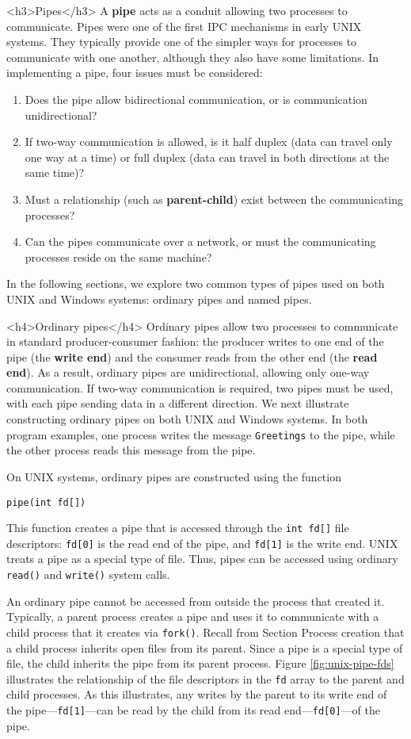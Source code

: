 <h3>Pipes</h3>
A \textbf{pipe} acts as a conduit allowing two processes to communicate. Pipes were one of the first IPC mechanisms in early UNIX systems. They typically provide one of the simpler ways for processes to communicate with one another, although they also have some limitations. In implementing a pipe, four issues must be considered:
\begin{enumerate}
\item Does the pipe allow bidirectional communication, or is communication unidirectional?
\item If two-way communication is allowed, is it half duplex (data can travel only one way at a time) or full duplex (data can travel in both directions at the same time)?
\item Must a relationship (such as \textbf{parent-child}) exist between the communicating processes?
\item Can the pipes communicate over a network, or must the communicating processes reside on the same machine?
\end{enumerate}
In the following sections, we explore two common types of pipes used on both UNIX and Windows systems: ordinary pipes and named pipes.

<h4>Ordinary pipes</h4>
Ordinary pipes allow two processes to communicate in standard producer-consumer fashion: the producer writes to one end of the pipe (the \textbf{write end}) and the consumer reads from the other end (the \textbf{read end}). As a result, ordinary pipes are unidirectional, allowing only one-way communication. If two-way communication is required, two pipes must be used, with each pipe sending data in a different direction. We next illustrate constructing ordinary pipes on both UNIX and Windows systems. In both program examples, one process writes the message \texttt{Greetings} to the pipe, while the other process reads this message from the pipe.

On UNIX systems, ordinary pipes are constructed using the function
\begin{verbatim}
pipe(int fd[])
\end{verbatim}
This function creates a pipe that is accessed through the \texttt{int fd[]} file descriptors: \texttt{fd[0]} is the read end of the pipe, and \texttt{fd[1]} is the write end. UNIX treats a pipe as a special type of file. Thus, pipes can be accessed using ordinary \texttt{read()} and \texttt{write()} system calls.

An ordinary pipe cannot be accessed from outside the process that created it. Typically, a parent process creates a pipe and uses it to communicate with a child process that it creates via \texttt{fork()}. Recall from Section Process creation that a child process inherits open files from its parent. Since a pipe is a special type of file, the child inherits the pipe from its parent process. Figure \ref{fig:unix-pipe-fds} illustrates the relationship of the file descriptors in the \texttt{fd} array to the parent and child processes. As this illustrates, any writes by the parent to its write end of the pipe---\texttt{fd[1]}---can be read by the child from its read end---\texttt{fd[0]}---of the pipe.

